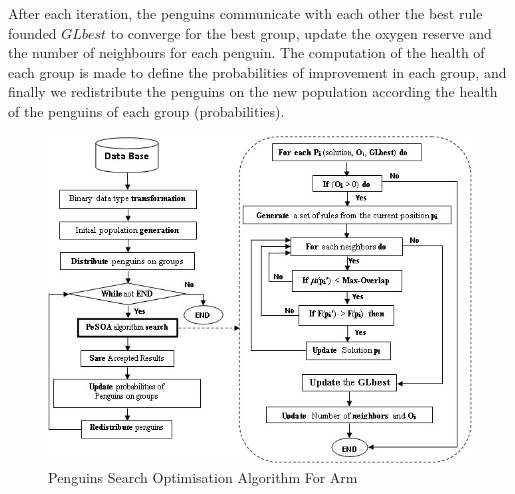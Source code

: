\documentclass[preprint,12pt]{elsarticle}
\begin{document}
 After each iteration, the penguins communicate with each other the best rule founded  $GLbest$ to converge for the best group, update the oxygen reserve and the number of neighbours  for each penguin. The computation of the health of each group is made to  define the probabilities of improvement in each group, and finally we redistribute the penguins on the new population according the health of the penguins of each group (probabilities). 
\begin{figure}[htbp]
\begin{center}
\includegraphics[width=15cm]{2.jpg}
\end{center}
\caption{Penguins Search Optimisation Algorithm For Arm}
\label{algo}
\end{figure}
\end{document}
